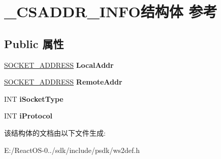 \hypertarget{struct___c_s_a_d_d_r___i_n_f_o}{}\section{\+\_\+\+C\+S\+A\+D\+D\+R\+\_\+\+I\+N\+F\+O结构体 参考}
\label{struct___c_s_a_d_d_r___i_n_f_o}
\subsection*{Public 属性}
\begin{DoxyCompactItemize}
\item 
\mbox{\label{struct___c_s_a_d_d_r___i_n_f_o_ab01e3a660421b6e21214deeb17ba8d07}} 
\hyperlink{struct___s_o_c_k_e_t___a_d_d_r_e_s_s}{S\+O\+C\+K\+E\+T\+\_\+\+A\+D\+D\+R\+E\+SS} {\bfseries Local\+Addr}
\item 
\mbox{\label{struct___c_s_a_d_d_r___i_n_f_o_a3fe96229192c2e25173ec144acccf670}} 
\hyperlink{struct___s_o_c_k_e_t___a_d_d_r_e_s_s}{S\+O\+C\+K\+E\+T\+\_\+\+A\+D\+D\+R\+E\+SS} {\bfseries Remote\+Addr}
\item 
\mbox{\label{struct___c_s_a_d_d_r___i_n_f_o_a5486fb8415bd9dcefdbc25a72b4e3cb8}} 
I\+NT {\bfseries i\+Socket\+Type}
\item 
\mbox{\label{struct___c_s_a_d_d_r___i_n_f_o_a2bfa973709cfa7de99bcde8bcb603639}} 
I\+NT {\bfseries i\+Protocol}
\end{DoxyCompactItemize}


该结构体的文档由以下文件生成\+:\begin{DoxyCompactItemize}
\item 
E\+:/\+React\+O\+S-\/0../sdk/include/psdk/ws2def.\+h\end{DoxyCompactItemize}
